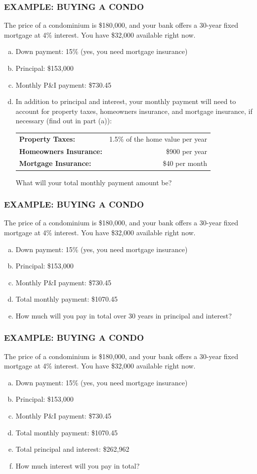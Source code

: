 \documentclass[8pt]{beamer}
\newcommand{\extitle}[1]{\frametitle{\fontfamily{fvs}\selectfont \small\color{black!70!blue!80!cyan}\uppercase{\bfseries Example: #1}}}
\def\solblank{\begin{tcolorbox}[colframe=black!50!blue!50!cyan,
colback=white,
bottomrule=0mm,
rightrule=0mm,
sharp corners=all] 
\vspace{6in}
\text{}
\end{tcolorbox}}
\begin{document}
\begin{frame}
\extitle{Buying a Condo}
The price of a condominium is \$180,000, and your bank offers a 30-year fixed mortgage at 4\% interest.  You have \$32,000 available right now.
\begin{enumerate}[(a)]
\item Down payment: 15\% (yes, you need mortgage insurance)
\item Principal: \$153,000
\item Monthly P\&I payment: \$730.45
\item In addition to principal and interest, your monthly payment will need to account for property taxes, homeowners insurance, and mortgage insurance, if necessary (find out in part (a)):
\begin{center}
\begin{tabular}{l r}
\textbf{Property Taxes:} & 1.5\% of the home value per year\\
\textbf{Homeowners Insurance:} & \$900 per year\\
\textbf{Mortgage Insurance:} & \$40 per month
\end{tabular}
\end{center}
What will your total monthly payment amount be?
\end{enumerate}

\solblank
\end{frame}

\begin{frame}
\extitle{Buying a Condo}
The price of a condominium is \$180,000, and your bank offers a 30-year fixed mortgage at 4\% interest.  You have \$32,000 available right now.
\begin{enumerate}[(a)]
\item Down payment: 15\% (yes, you need mortgage insurance)
\item Principal: \$153,000
\item Monthly P\&I payment: \$730.45
\item Total monthly payment: \$1070.45
\item How much will you pay in total over 30 years in principal and interest?
\end{enumerate}

\solblank
\end{frame}

\begin{frame}
\extitle{Buying a Condo}
The price of a condominium is \$180,000, and your bank offers a 30-year fixed mortgage at 4\% interest.  You have \$32,000 available right now.
\begin{enumerate}[(a)]
\item Down payment: 15\% (yes, you need mortgage insurance)
\item Principal: \$153,000
\item Monthly P\&I payment: \$730.45
\item Total monthly payment: \$1070.45
\item Total principal and interest: \$262,962
\item How much interest will you pay in total?
\end{enumerate}

\solblank
\end{frame}
\end{document}
